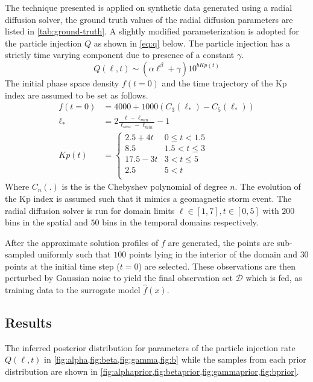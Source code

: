 The technique presented is applied on synthetic data generated using a radial diffusion solver, 
the ground truth values of the radial diffusion parameters are listed in \cref{tab:ground-truth}.
A slightly modified parameterization is adopted for the particle injection $Q$ as shown in 
\cref{eq:q} below. The particle injection has a strictly time varying component due to presence of 
a constant $\gamma$.
%
\begin{equation}\label{eq:q}
Q(\ell,t)  \sim (\alpha \ell^{\beta} + \gamma) 10^{b Kp(t)}
\end{equation}
%
The initial phase space density $f(t = 0)$ and the time trajectory of the Kp index are assumed to 
be set as follows.
%
\begin{align}
f(t = 0) &= 4000 + 1000(C_{3}(\ell_*) - C_{5}(\ell_*)) \\
\ell_* &= 2\frac{\ell - \ell_{min}}{\ell_{max} - \ell_{min}} - 1 \\
Kp(t) &= \left\{\begin{matrix}
2.5 + 4t & 0 \leq t < 1.5\\ 
8.5 & 1.5 < t \leq 3\\ 
17.5-3t & 3 <  t \leq 5 \\ 
2.5 & 5 < t\\ 
\end{matrix}\right.
\end{align}
%
Where $C_n(.)$ is the is the Chebyshev polynomial of degree $n$. The evolution of the Kp index 
\citet{BartelsKp} is assumed such that it mimics a geomagnetic storm event. The radial diffusion 
solver is run for domain limits $\ell \in [1, 7], t \in [0, 5]$ with $200$ bins in the spatial and 
$50$ bins in the temporal domains respectively.

After the approximate solution profiles of $f$ are generated, the points are sub-sampled uniformly 
such that $100$ points lying in the interior of the domain and $30$ points at the initial time step 
($t = 0$) are selected. These observations are then perturbed by Gaussian noise to yield the final 
observation set $\mathcal{D}$ which is fed, as training data to the surrogate model $\hat{f}(x)$.

\subsection*{Results}

The inferred posterior distribution for parameters of the particle injection rate $Q(\ell, t)$ in 
\cref{fig:alpha,fig:beta,fig:gamma,fig:b} while the samples from each prior distribution are shown 
in \cref{fig:alphaprior,fig:betaprior,fig:gammaprior,fig:bprior}.

